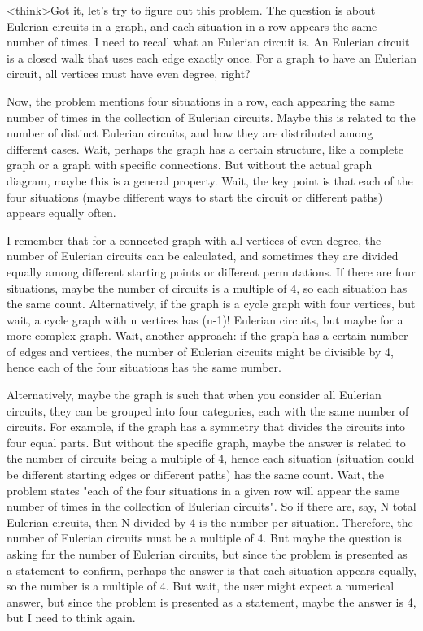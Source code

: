 <think>Got it, let's try to figure out this problem. The question is about Eulerian circuits in a graph, and each situation in a row appears the same number of times. I need to recall what an Eulerian circuit is. An Eulerian circuit is a closed walk that uses each edge exactly once. For a graph to have an Eulerian circuit, all vertices must have even degree, right?

Now, the problem mentions four situations in a row, each appearing the same number of times in the collection of Eulerian circuits. Maybe this is related to the number of distinct Eulerian circuits, and how they are distributed among different cases. Wait, perhaps the graph has a certain structure, like a complete graph or a graph with specific connections. But without the actual graph diagram, maybe this is a general property. Wait, the key point is that each of the four situations (maybe different ways to start the circuit or different paths) appears equally often. 

I remember that for a connected graph with all vertices of even degree, the number of Eulerian circuits can be calculated, and sometimes they are divided equally among different starting points or different permutations. If there are four situations, maybe the number of circuits is a multiple of 4, so each situation has the same count. Alternatively, if the graph is a cycle graph with four vertices, but wait, a cycle graph with n vertices has (n-1)! Eulerian circuits, but maybe for a more complex graph. Wait, another approach: if the graph has a certain number of edges and vertices, the number of Eulerian circuits might be divisible by 4, hence each of the four situations has the same number. 

Alternatively, maybe the graph is such that when you consider all Eulerian circuits, they can be grouped into four categories, each with the same number of circuits. For example, if the graph has a symmetry that divides the circuits into four equal parts. But without the specific graph, maybe the answer is related to the number of circuits being a multiple of 4, hence each situation (situation could be different starting edges or different paths) has the same count. Wait, the problem states "each of the four situations in a given row will appear the same number of times in the collection of Eulerian circuits". So if there are, say, N total Eulerian circuits, then N divided by 4 is the number per situation. Therefore, the number of Eulerian circuits must be a multiple of 4. But maybe the question is asking for the number of Eulerian circuits, but since the problem is presented as a statement to confirm, perhaps the answer is that each situation appears equally, so the number is a multiple of 4. But wait, the user might expect a numerical answer, but since the problem is presented as a statement, maybe the answer is 4, but I need to think again.

